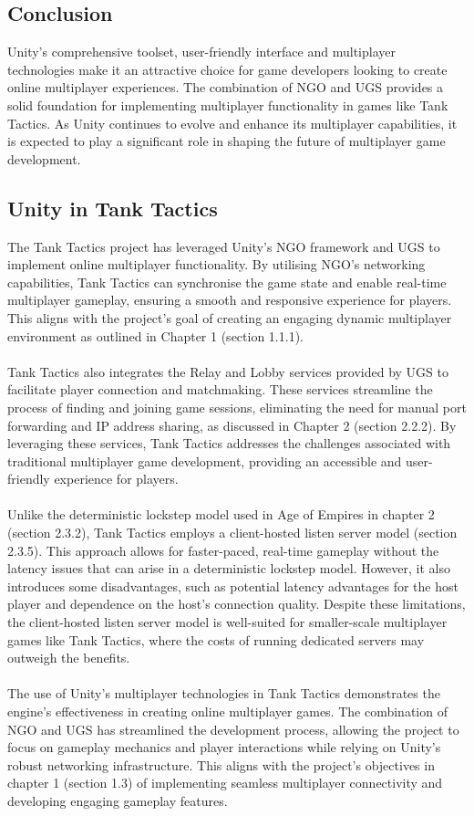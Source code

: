 \subsection{Conclusion}
Unity's comprehensive toolset, user-friendly interface and multiplayer technologies make it an attractive choice for game developers looking to create online multiplayer experiences. The combination of NGO and UGS provides a solid foundation for implementing multiplayer functionality in games like Tank Tactics. As Unity continues to evolve and enhance its multiplayer capabilities, it is expected to play a significant role in shaping the future of multiplayer game development.

\subsection{Unity in Tank Tactics}
The Tank Tactics project has leveraged Unity's NGO framework and UGS to implement online multiplayer functionality. By utilising NGO's networking capabilities, Tank Tactics can synchronise the game state and enable real-time multiplayer gameplay, ensuring a smooth and responsive experience for players. This aligns with the project's goal of creating an engaging dynamic multiplayer environment as outlined in Chapter 1 (section 1.1.1).
\\
\noindent
\\
Tank Tactics also integrates the Relay and Lobby services provided by UGS to facilitate player connection and matchmaking. These services streamline the process of finding and joining game sessions, eliminating the need for manual port forwarding and IP address sharing, as discussed in Chapter 2 (section 2.2.2). By leveraging these services, Tank Tactics addresses the challenges associated with traditional multiplayer game development, providing an accessible and user-friendly experience for players.
\\
\noindent
\\
Unlike the deterministic lockstep model used in Age of Empires in chapter 2 (section 2.3.2), Tank Tactics employs a client-hosted listen server model (section 2.3.5). This approach allows for faster-paced, real-time gameplay without the latency issues that can arise in a deterministic lockstep model. However, it also introduces some disadvantages, such as potential latency advantages for the host player and dependence on the host's connection quality. Despite these limitations, the client-hosted listen server model is well-suited for smaller-scale multiplayer games like Tank Tactics, where the costs of running dedicated servers may outweigh the benefits.
\\
\noindent
\\
The use of Unity's multiplayer technologies in Tank Tactics demonstrates the engine's effectiveness in creating online multiplayer games. The combination of NGO and UGS has streamlined the development process, allowing the project to focus on gameplay mechanics and player interactions while relying on Unity's robust networking infrastructure. This aligns with the project's objectives in chapter 1 (section 1.3) of implementing seamless multiplayer connectivity and developing engaging gameplay features.

